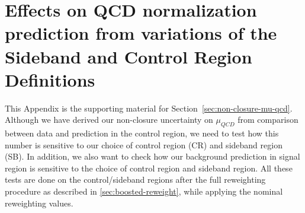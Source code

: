 \section{Effects on QCD normalization prediction from variations of the Sideband and Control Region Definitions}
\label{app:boosted-syst-CRSB_Definition_Variation}

This Appendix is the supporting material for Section~\ref{sec:non-closure-mu-qcd}. Although we have derived our non-closure uncertainty on $\mu_{QCD}$ from comparison between data and prediction in the control region, we need to test how this number is sensitive to our choice of control region (CR) and sideband region (SB). In addition, we also want to check how our background prediction in signal region is sensitive to the choice of control region and sideband region. All these tests are done on the control/sideband regions after the full reweighting procedure as described in \ref{sec:boosted-reweight}, while applying the nominal reweighting values.

